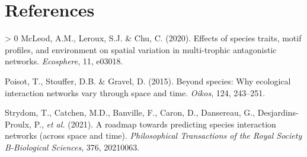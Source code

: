 \documentclass[11pt]{article}
\newlength{\cslhangindent}
\newenvironment{CSLReferences}[3] %
 {%
  \setlength{\parindent}{0pt}
  \ifodd #1 \everypar{\setlength{\hangindent}{\cslhangindent}}\ignorespaces\fi
  \ifnum #2 > 0
  \setlength{\parskip}{#2\baselineskip}
  \fi
 }%
 {}
\begin{document}
\hypertarget{references}{%
\section*{References}\label{references}}

\hypertarget{refs}{}
\begin{CSLReferences}{1}{0}
\leavevmode\hypertarget{ref-McLeod2020EffSpe}{}%
McLeod, A.M., Leroux, S.J. \& Chu, C. (2020). Effects of species traits,
motif profiles, and environment on spatial variation in multi-trophic
antagonistic networks. \emph{Ecosphere}, 11, e03018.

\leavevmode\hypertarget{ref-Poisot2015SpeWhy}{}%
Poisot, T., Stouffer, D.B. \& Gravel, D. (2015). Beyond species: Why
ecological interaction networks vary through space and time.
\emph{Oikos}, 124, 243--251.

\leavevmode\hypertarget{ref-Strydom2021RoaPre}{}%
Strydom, T., Catchen, M.D., Banville, F., Caron, D., Dansereau, G.,
Desjardins-Proulx, P., \emph{et al.} (2021). A roadmap towards
predicting species interaction networks (across space and time).
\emph{Philosophical Transactions of the Royal Society B-Biological
Sciences}, 376, 20210063.

\end{CSLReferences}
\end{document}
